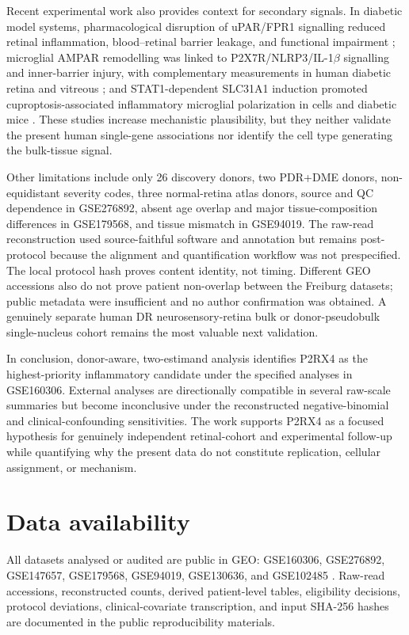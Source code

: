 \documentclass[12pt]{article}
\begin{document}
Recent experimental work also provides context for secondary signals. In diabetic model systems, pharmacological disruption of uPAR/FPR1 signalling reduced retinal inflammation, blood--retinal barrier leakage, and functional impairment \citep{Canovai2026}; microglial AMPAR remodelling was linked to P2X7R/NLRP3/IL-1$\beta$ signalling and inner-barrier injury, with complementary measurements in human diabetic retina and vitreous \citep{Zhang2026NLRP3}; and STAT1-dependent SLC31A1 induction promoted cuproptosis-associated inflammatory microglial polarization in cells and diabetic mice \citep{Huang2026SLC31A1}. These studies increase mechanistic plausibility, but they neither validate the present human single-gene associations nor identify the cell type generating the bulk-tissue signal.

Other limitations include only 26 discovery donors, two PDR+DME donors, non-equidistant severity codes, three normal-retina atlas donors, source and QC dependence in GSE276892, absent age overlap and major tissue-composition differences in GSE179568, and tissue mismatch in GSE94019. The raw-read reconstruction used source-faithful software and annotation but remains post-protocol because the alignment and quantification workflow was not prespecified. The local protocol hash proves content identity, not timing. Different GEO accessions also do not prove patient non-overlap between the Freiburg datasets; public metadata were insufficient and no author confirmation was obtained. A genuinely separate human DR neurosensory-retina bulk or donor-pseudobulk single-nucleus cohort remains the most valuable next validation.

In conclusion, donor-aware, two-estimand analysis identifies P2RX4 as the highest-priority inflammatory candidate under the specified analyses in GSE160306. External analyses are directionally compatible in several raw-scale summaries but become inconclusive under the reconstructed negative-binomial and clinical-confounding sensitivities. The work supports P2RX4 as a focused hypothesis for genuinely independent retinal-cohort and experimental follow-up while quantifying why the present data do not constitute replication, cellular assignment, or mechanism.

\section*{Data availability}
All datasets analysed or audited are public in GEO: GSE160306, GSE276892, GSE147657, GSE179568, GSE94019, GSE130636, and GSE102485 \citep{GSE160306,GSE276892,GSE147657,GSE179568,GSE94019,GSE130636,GSE102485}. Raw-read accessions, reconstructed counts, derived patient-level tables, eligibility decisions, protocol deviations, clinical-covariate transcription, and input SHA-256 hashes are documented in the public reproducibility materials.
\end{document}
